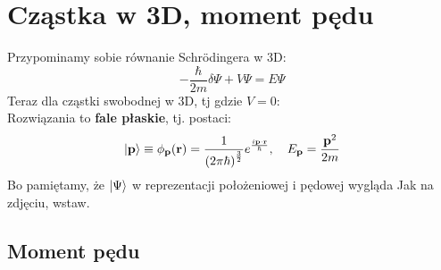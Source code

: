 \documentclass[12pt,a4paper]{report}
\newcommand{\com}[1]{{\color{red} #1}}
\renewcommand{\emph}{\textbf}
\newenvironment{lecture}[1]{\par\medskip
   \noindent\chapter{#1} \rmfamily}{\medskip}
\begin{document}
\begin{lecture}{Cząstka w 3D, moment pędu}
Przypominamy sobie równanie Schrödingera w 3D:
\[
    -\frac{\hbar}{2m} \delta \Psi + V \Psi = E \Psi
\]
Teraz dla cząstki swobodnej w 3D, tj gdzie $V = 0$:\\
Rozwiązania to \emph{fale płaskie}, tj. postaci:
\[
    \ket{\vb{p}} \equiv \phi_{\vb{p}}(\vb{r}) = \frac{1}{\qty(2 \pi \hbar)^{\frac32}} e^{\frac{i \vb{p}\cdot\vb{r}}{\hbar}}\qc E_{\vb{p}} = \frac{\vb{p}^2}{2 m}
\]
Bo pamiętamy, że $\ket{\Psi}$ w reprezentacji położeniowej i pędowej wygląda \com{Jak na zdjęciu, wstaw.}

\section{Moment pędu}


\end{lecture}
\end{document}
